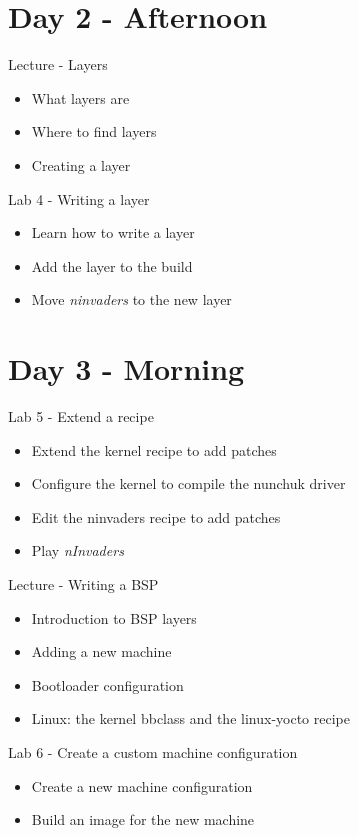 \documentclass[a4paper,12pt,obeyspaces,spaces,hyphens]{article}
\begin{document}
\section{Day 2 - Afternoon}

\feagendatwocolumn
{Lecture - Layers}
{
  \begin{itemize}
  \item What layers are
  \item Where to find layers
  \item Creating a layer
  \end{itemize}
}
{Lab 4 - Writing a layer}
{
  \begin{itemize}
  \item Learn how to write a layer
  \item Add the layer to the build
  \item Move {\em ninvaders} to the new layer
  \end{itemize}
}

\section{Day 3 - Morning}

\feagendaonecolumn
{Lab 5 - Extend a recipe}
{
  \begin{itemize}
  \item Extend the kernel recipe to add patches
  \item Configure the kernel to compile the nunchuk driver
  \item Edit the ninvaders recipe to add patches
  \item Play {\em nInvaders}
  \end{itemize}
}

\feagendatwocolumn
{Lecture - Writing a BSP}
{
  \begin{itemize}
  \item Introduction to BSP layers
  \item Adding a new machine
  \item Bootloader configuration
  \item Linux: the kernel bbclass and the linux-yocto recipe
  \end{itemize}
}
{Lab 6 - Create a custom machine configuration}
{
  \begin{itemize}
  \item Create a new machine configuration
  \item Build an image for the new machine
  \end{itemize}
}
\end{document}
